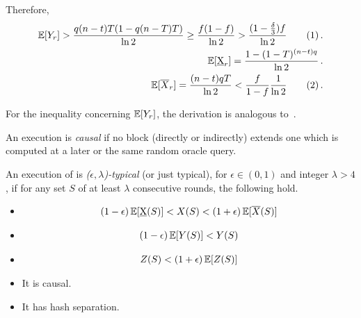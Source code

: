 Therefore,
\begin{align*}
  \E[Y_r] > \frac{q(n - t)T(1 - q(n - T)T)}{\ln2} \geq \frac{f(1 - f)}{\ln2} > \frac{(1 - \frac{\delta}{3})f}{\ln2} \stepcounter{equation}\tag{\theequation}\label{eq.ex-y-bound}\,.\\
  \E[\underbar{X}_r] = \frac{1 - (1 - T)^{(n - t)q}}{\ln2}\,.\\
  \E[\overline{X}_r] = \frac{(n - t)qT}{\ln2} < \frac{f}{1 - f}\frac{1}{\ln2} \stepcounter{equation}\tag{\theequation}\label{eq.ex-overline-x-bound}\,.
\end{align*}

For the inequality concerning $\mathop{{}\mathbb{E}}[Y_r]$, the derivation is analogous to~\cite{backbone}.

\begin{definition}[Causality]
  An execution is \emph{causal} if no block (directly or indirectly) extends
  one which is computed at a later or the same random oracle query.
\end{definition}

\begin{definition}
  An execution of \poem is \emph{($\epsilon,\lambda$)-typical} (or just typical),
  for $\epsilon \in (0,1)$ and integer $\lambda > 4$, if for any set $S$ of at
  least $\lambda$ consecutive rounds, the following hold.
  \begin{itemize}
    \item
    \begin{minipage}{\linewidth}%
      \vspace{-\abovedisplayskip}%
      \begin{align}%
        (1 - \epsilon) \E[\underbar{X}(S)] < X(S) < (1 + \epsilon) \E[\overline{X}(S)] \label{eq.typical-x}%
      \end{align}%
    \end{minipage}

    \item
    \begin{minipage}{\linewidth}%
      \vspace{-\abovedisplayskip}%
      \begin{align}%
        (1 - \epsilon) \E[Y(S)] < Y(S) \label{eq.typical-y}%
      \end{align}%
    \end{minipage}

    \item
    \begin{minipage}{\linewidth}%
      \vspace{-\abovedisplayskip}%
      \begin{align}%
        Z(S) < (1 + \epsilon)\E[Z(S)] \label{eq.typical-z}%
      \end{align}%
    \end{minipage}

    \item It is causal.
    \item It has hash separation.
  \end{itemize}
\end{definition}

